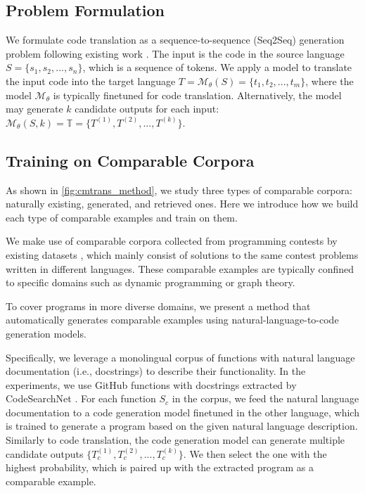 \subsection{Problem Formulation}
We formulate code translation as a sequence-to-sequence (Seq2Seq) generation problem following existing work \cite{codexglue,avatar,transcoder}.
The input is the code in the source language $S = \{s_1, s_2, ..., s_n \}$, which is a sequence of tokens.
We apply a model to translate the input code into the target language $T = \mathcal{M}_{\theta}(S) = \{t_1, t_2, ..., t_m \}$, where the model $\mathcal{M}_{\theta}$ is typically finetuned for code translation. 
Alternatively, the model may generate $k$ candidate outputs for each input: $\mathcal{M}_{\theta}(S,k) = \mathbb{T} = \{ T^{(1)}, T^{(2)}, ..., T^{(k)} \}$. 

\subsection{Training on Comparable Corpora}
\label{sec:comparable}

As shown in \autoref{fig:cmtrans_method}, we study three types of comparable corpora: naturally existing, generated, and retrieved ones. Here we introduce how we build each type of comparable examples and train \cmtransours on them.

We make use of comparable corpora collected from programming contests by existing datasets \cite{avatar,xcodeeval,codenet}, which mainly consist of solutions to the same contest problems written in different languages.
These comparable examples are typically confined to specific domains such as dynamic programming or graph theory.


To cover programs in more diverse domains, we present a method that automatically generates comparable examples using natural-language-to-code generation models.

Specifically, we leverage a monolingual corpus of functions with natural language documentation (i.e., docstrings) to describe their functionality.
In the experiments, we use GitHub functions with docstrings extracted by CodeSearchNet \cite{codesearchnet}.
For each function $S_c$ in the corpus, we feed the natural language documentation to a code generation model finetuned in the other language, which is trained to generate a program based on the given natural language description.
Similarly to code translation, the code generation model can generate multiple candidate outputs $\{ T_c^{(1)}, T_c^{(2)}, ..., T_c^{(k)} \}$.
We then select the one with the highest probability, which is paired up with the extracted program as a comparable example.


